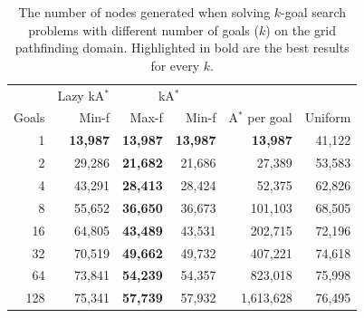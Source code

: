 \documentclass{aicom2e}
\newcommand{\kgs}{$k$-goal search}
\newcommand{\astar}{A$^*$}
\newcommand{\kastar}{kA$^*$}
\newcommand{\minf}{Min-f}
\newcommand{\maxf}{Max-f}
\begin{document}

\begin{table}[]
	\centering
	\begin{tabular}{r|r|rr|r|r}
		& \multicolumn{1}{c|}{Lazy \kastar{}} & \multicolumn{2}{c|}{\kastar{}} &             &         \\
		Goals & Min-f                        & \maxf{}      & \minf{}     & \astar{} per goal & Uniform \\
		\hline
1                         & \textbf{13,987}                      & \textbf{13,987}           & \textbf{13,987}           & \textbf{13,987}                 & 41,122                      \\
2                         & 29,286                               & \textbf{21,682}           & 21,686                    & 27,389                          & 53,583                      \\
4                         & 43,291                               & \textbf{28,413}           & 28,424                    & 52,375                          & 62,826                      \\
8                         & 55,652                               & \textbf{36,650}           & 36,673                    & 101,103                         & 68,505                      \\
16                        & 64,805                               & \textbf{43,489}           & 43,531                    & 202,715                         & 72,196                      \\
32                        & 70,519                               & \textbf{49,662}           & 49,732                    & 407,221                         & 74,618                      \\
64                        & 73,841                               & \textbf{54,239}           & 54,357                    & 823,018                         & 75,998                      \\
128                       & 75,341                               & \textbf{57,739}           & 57,932                    & 1,613,628                       & 76,495               
	\end{tabular}
	\caption{The number of nodes generated when solving \kgs{} problems with different number of goals ($k$) on the grid pathfinding domain. Highlighted in bold are the best results for every $k$.}
	\label{tab:pathfinding-generated}
\end{table}
\end{document}
